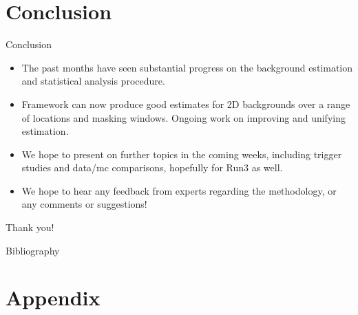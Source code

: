 \documentclass[10pt]{beamer}
\begin{document}
%   
%   


\section{Conclusion}
\label{sec:conclusion}


\begin{frame}{Conclusion}
  \begin{itemize}
  \item The past months have seen substantial progress on the background estimation and statistical analysis procedure.
  \item Framework can now produce good estimates for 2D backgrounds over a range of locations and masking windows. Ongoing work on improving and unifying estimation. 
  \item We hope to present on further topics in the coming weeks, including trigger studies and data/mc comparisons, hopefully for Run3 as well. 
  \item We hope to hear any feedback from experts regarding the methodology, or any comments or suggestions!
  \end{itemize}
  \vspace{1cm}

  \begin{center}
    {\Large Thank you!}
  \end{center}
\end{frame}


\begin{frame}[allowframebreaks]{Bibliography}
  
  
\end{frame}


\appendix

\section{Appendix}
\label{sec:appendix}
\end{document}
